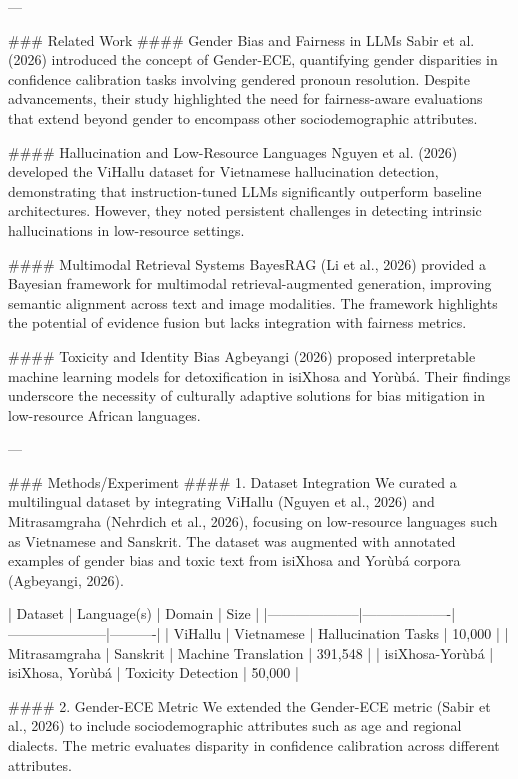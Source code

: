 ---

### Related Work
#### Gender Bias and Fairness in LLMs
Sabir et al. (2026) introduced the concept of Gender-ECE, quantifying gender disparities in confidence calibration tasks involving gendered pronoun resolution. Despite advancements, their study highlighted the need for fairness-aware evaluations that extend beyond gender to encompass other sociodemographic attributes.

#### Hallucination and Low-Resource Languages
Nguyen et al. (2026) developed the ViHallu dataset for Vietnamese hallucination detection, demonstrating that instruction-tuned LLMs significantly outperform baseline architectures. However, they noted persistent challenges in detecting intrinsic hallucinations in low-resource settings.

#### Multimodal Retrieval Systems
BayesRAG (Li et al., 2026) provided a Bayesian framework for multimodal retrieval-augmented generation, improving semantic alignment across text and image modalities. The framework highlights the potential of evidence fusion but lacks integration with fairness metrics.

#### Toxicity and Identity Bias
Agbeyangi (2026) proposed interpretable machine learning models for detoxification in isiXhosa and Yorùbá. Their findings underscore the necessity of culturally adaptive solutions for bias mitigation in low-resource African languages.

---

### Methods/Experiment
#### 1. Dataset Integration
We curated a multilingual dataset by integrating ViHallu (Nguyen et al., 2026) and Mitrasamgraha (Nehrdich et al., 2026), focusing on low-resource languages such as Vietnamese and Sanskrit. The dataset was augmented with annotated examples of gender bias and toxic text from isiXhosa and Yorùbá corpora (Agbeyangi, 2026).

| Dataset           | Language(s)       | Domain              | Size     |
|--------------------|-------------------|---------------------|----------|
| ViHallu           | Vietnamese        | Hallucination Tasks | 10,000   |
| Mitrasamgraha      | Sanskrit          | Machine Translation | 391,548  |
| isiXhosa-Yorùbá    | isiXhosa, Yorùbá  | Toxicity Detection  | 50,000   |

#### 2. Gender-ECE Metric
We extended the Gender-ECE metric (Sabir et al., 2026) to include sociodemographic attributes such as age and regional dialects. The metric evaluates disparity in confidence calibration across different attributes.

